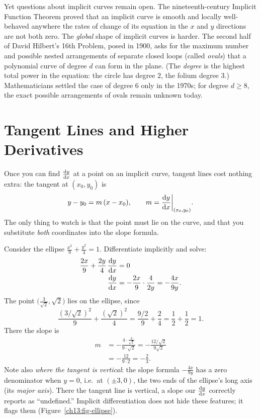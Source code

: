 \begin{historybox}
Yet questions about implicit curves remain open. The nineteenth-century Implicit Function Theorem proved that an implicit curve is smooth and locally well-behaved anywhere the rates of change of its equation in the $x$ and $y$ directions are not both zero. The \emph{global} shape of implicit curves is harder. The second half of David Hilbert's 16th Problem, posed in 1900, asks for the maximum number and possible nested arrangements of separate closed loops (called \emph{ovals}) that a polynomial curve of degree $d$ can form in the plane. (The \emph{degree} is the highest total power in the equation: the circle has degree $2$, the folium degree $3$.) Mathematicians settled the case of degree $6$ only in the 1970s; for degree $d \ge 8$, the exact possible arrangements of ovals remain unknown today.
\end{historybox}

\section{Tangent Lines and Higher Derivatives}
\label{ch13:tangents}

Once you can find $\frac{\mathrm{d} y}{\mathrm{d} x}$ at a point on an implicit curve, tangent lines cost nothing extra: the
tangent at $(x_0,y_0)$ is
\[
y - y_0 = m\,(x - x_0), \qquad m = \frac{\mathrm{d} y}{\mathrm{d} x}\bigg|_{(x_0,y_0)}.
\]
The only thing to watch is that the point must lie on the curve, and that you substitute
\emph{both} coordinates into the slope formula.

\begin{example}
\label{ch13:ex-ellipse}
Consider the ellipse $\frac{x^2}{9} + \frac{y^2}{4} = 1$. Differentiate implicitly and solve:
\begin{align*}
\frac{2x}{9} + \frac{2y}{4}\,\frac{\mathrm{d} y}{\mathrm{d} x} &= 0 \\
\frac{\mathrm{d} y}{\mathrm{d} x} &= -\frac{2x}{9}\cdot\frac{4}{2y} = -\frac{4x}{9y}.
\end{align*}
The point $\big(\tfrac{3}{\sqrt2}, \sqrt2\big)$ lies on the ellipse, since
\[
\frac{(3/\sqrt2)^2}{9} + \frac{(\sqrt2)^2}{4} = \frac{9/2}{9} + \frac{2}{4} = \frac12 + \frac12 = 1.
\]
There the slope is
\begin{align*}
m &= -\frac{4\cdot \tfrac{3}{\sqrt2}}{9\cdot \sqrt2} = -\frac{12/\sqrt2}{9\sqrt2} \\
  &= -\frac{12}{9\cdot 2} = -\frac{2}{3}.
\end{align*}
Note also \emph{where the tangent is vertical}: the slope formula $-\tfrac{4x}{9y}$ has a zero
denominator when $y=0$, i.e.\ at $(\pm 3, 0)$, the two ends of the ellipse's long axis (its
\emph{major axis}). There the tangent line is vertical, a
slope our $\frac{\mathrm{d} y}{\mathrm{d} x}$ correctly reports as ``undefined.''
Implicit differentiation does not hide these features; it flags them
(Figure~\ref{ch13:fig-ellipse}).
\end{example}

